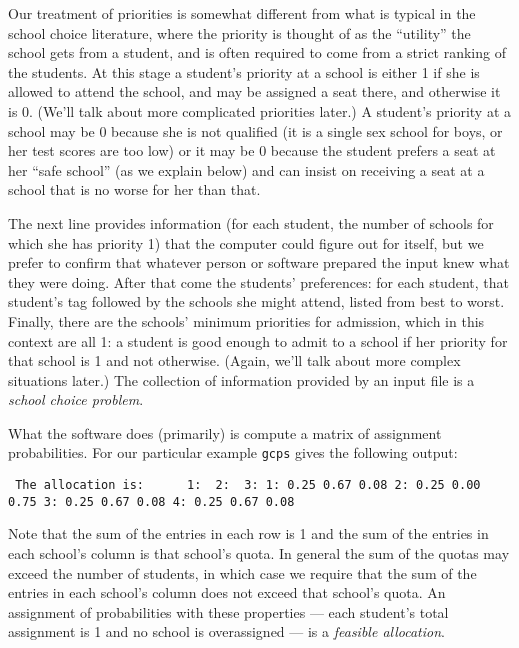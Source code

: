 \documentclass[12pt]{article}
\theoremstyle{definition}
\begin{document}
Our treatment of priorities is somewhat different from what is typical
in the school choice literature, where the priority is thought of as
the ``utility'' the school gets from a student, and is often required
to come from a strict ranking of the students.  At this stage a
student's priority at a school is either 1 if she is allowed to attend
the school, and may be assigned a seat there, and otherwise it is 0.
(We'll talk about more complicated priorities later.)  A student's
priority at a school may be 0 because she is not qualified (it is a
single sex school for boys, or her test scores are too low) or it may
be 0 because the student prefers a seat at her ``safe school'' (as we
explain below) and can insist on receiving a seat at a school that is
no worse for her than that.

The next line provides information (for each student, the number of
schools for which she has priority 1) that the computer could figure
out for itself, but we prefer to confirm that whatever person or
software prepared the input knew what they were doing.  After that
come the students' preferences: for each student, that student's tag
followed by the schools she might attend, listed from best to worst.
Finally, there are the schools' minimum priorities for admission,
which in this context are all 1: a student is good enough to admit to
a school if her priority for that school is 1 and not
otherwise. (Again, we'll talk about more complex situations later.)
The collection of information provided by an input file is a
\emph{school choice problem}.

What the software does (primarily) is compute a matrix of assignment
probabilities.  For our particular example \texttt{gcps} gives the
following output:
\medskip
\begin{obeylines}\texttt{
The allocation is:
\ \ \ \ \ 1:    \    2:  \      3:
1:      0.25     0.67     0.08
2:      0.25     0.00     0.75
3:      0.25     0.67     0.08
4:      0.25     0.67     0.08
}
\end{obeylines} \noindent

\smallskip
Note that the sum of the entries in each row is 1 and the sum of the
entries in each school's column is that school's quota.  In general
the sum of the quotas may exceed the number of students, in which case
we require that the sum of the entries in each school's column does
not exceed that school's quota. An assignment of probabilities with
these properties --- each student's total assignment is 1 and no
school is overassigned --- is a \emph{feasible allocation}.  
\end{document}
